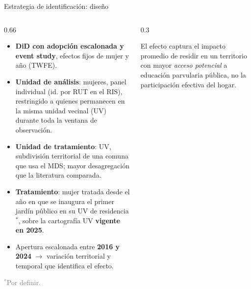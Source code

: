 \documentclass[aspectratio=169,10pt]{beamer}
\newcommand{\fuente}[1]{\vspace{2pt}\textcolor{graytext}{\scriptsize #1}}
\begin{document}
\begin{frame}{Estrategia de identificación: diseño}
\vspace{-6pt}
\begin{columns}[T]
\begin{column}{0.66\textwidth}
\begingroup
{}
\begin{itemize}
  \small
  \item \textbf{DiD con adopción escalonada y event study}, efectos fijos de mujer y año (TWFE).
  \item \textbf{Unidad de análisis}: mujeres, panel individual (id. por RUT en el RIS), restringido a quienes permanecen en la misma unidad vecinal (UV) durante toda la ventana de observación.
  \item \textbf{Unidad de tratamiento}: UV, subdivisión territorial de una comuna que usa el MDS; mayor desagregación que la literatura comparada.
  \item \textbf{Tratamiento}: mujer tratada desde el año en que se inaugura el primer jardín público en su UV de residencia$^{*}$, sobre la cartografía UV \textbf{vigente en 2025}.
  \item Apertura escalonada entre \textbf{2016 y 2024} $\to$ variación territorial y temporal que identifica el efecto.
\end{itemize}
\endgroup
\fuente{$^{*}$Por definir.}
\end{column}
\begin{column}{0.3\textwidth}
\small
{}
\vspace{6pt}

\small El efecto captura el impacto promedio de residir en un territorio con mayor \emph{acceso potencial} a educación parvularia pública, no la participación efectiva del hogar.
\end{column}
\end{columns}
\end{frame}
\end{document}
